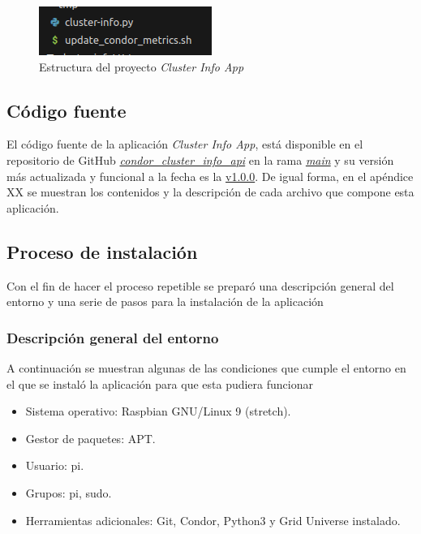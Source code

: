 \begin{figure}[H]
	\centering
	\includegraphics[scale=0.35]{tablas-images/pmv/estructura-proyecto-cluster-info-app.png}
	\caption{Estructura del proyecto \textit{Cluster Info App}}
	\label{fig:estructura-proyecto-cluster-info-app}
\end{figure}

\subsection{Código fuente}

\noindent
El código fuente de la aplicación \textit{Cluster Info App}, está disponible en el repositorio de GitHub \href{https://github.com/JuanEstebanOsma1012/condor\_cluster\_info\_api}{\textit{condor\_cluster\_info\_api}} en la rama \href{https://github.com/JuanEstebanOsma1012/condor\_cluster\_info\_api/tree/main}{\textit{main}} y su versión más actualizada y funcional a la fecha es la \href{https://github.com/JuanEstebanOsma1012/condor\_cluster\_info\_api/releases/tag/v1.0.0}{v1.0.0}. De igual forma, en el apéndice XX se muestran los contenidos y la descripción de cada archivo que compone esta aplicación.

\subsection{Proceso de instalación}
\noindent

Con el fin de hacer el proceso repetible se preparó una descripción general del entorno y una serie de pasos para la instalación de la aplicación

\subsubsection{Descripción general del entorno}
\noindent
A continuación se muestran algunas de las condiciones que cumple el entorno en el que se instaló la aplicación para que esta pudiera funcionar

\begin{itemize}
	\item Sistema operativo: Raspbian GNU/Linux 9 (stretch).
	\item Gestor de paquetes: APT.
	\item Usuario: pi.
	\item Grupos: pi, sudo.
	\item Herramientas adicionales: Git, Condor, Python3 y Grid Universe instalado.
\end{itemize}

